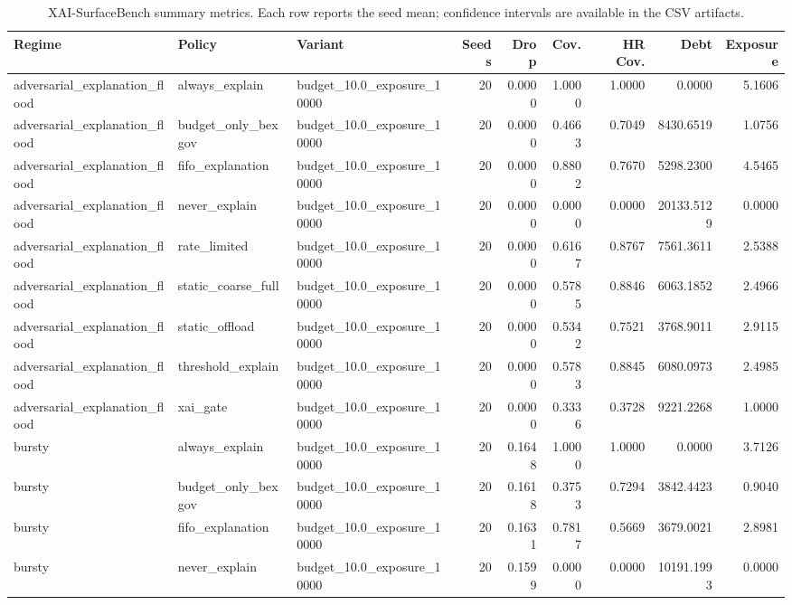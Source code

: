 \begin{table}[t]
\centering
\scriptsize
\caption{XAI-SurfaceBench summary metrics. Each row reports the seed mean; confidence intervals are available in the CSV artifacts.}
\begin{tabular}{lllrrrrrr}
\toprule
Regime & Policy & Variant & Seeds & Drop & Cov. & HR Cov. & Debt & Exposure \\
\midrule
adversarial\_explanation\_flood & always\_explain & budget\_10.0\_exposure\_10000 & 20 & 0.0000 & 1.0000 & 1.0000 & 0.0000 & 5.1606 \\
adversarial\_explanation\_flood & budget\_only\_bexgov & budget\_10.0\_exposure\_10000 & 20 & 0.0000 & 0.4663 & 0.7049 & 8430.6519 & 1.0756 \\
adversarial\_explanation\_flood & fifo\_explanation & budget\_10.0\_exposure\_10000 & 20 & 0.0000 & 0.8802 & 0.7670 & 5298.2300 & 4.5465 \\
adversarial\_explanation\_flood & never\_explain & budget\_10.0\_exposure\_10000 & 20 & 0.0000 & 0.0000 & 0.0000 & 20133.5129 & 0.0000 \\
adversarial\_explanation\_flood & rate\_limited & budget\_10.0\_exposure\_10000 & 20 & 0.0000 & 0.6167 & 0.8767 & 7561.3611 & 2.5388 \\
adversarial\_explanation\_flood & static\_coarse\_full & budget\_10.0\_exposure\_10000 & 20 & 0.0000 & 0.5785 & 0.8846 & 6063.1852 & 2.4966 \\
adversarial\_explanation\_flood & static\_offload & budget\_10.0\_exposure\_10000 & 20 & 0.0000 & 0.5342 & 0.7521 & 3768.9011 & 2.9115 \\
adversarial\_explanation\_flood & threshold\_explain & budget\_10.0\_exposure\_10000 & 20 & 0.0000 & 0.5783 & 0.8845 & 6080.0973 & 2.4985 \\
adversarial\_explanation\_flood & xai\_gate & budget\_10.0\_exposure\_10000 & 20 & 0.0000 & 0.3336 & 0.3728 & 9221.2268 & 1.0000 \\
bursty & always\_explain & budget\_10.0\_exposure\_10000 & 20 & 0.1648 & 1.0000 & 1.0000 & 0.0000 & 3.7126 \\
bursty & budget\_only\_bexgov & budget\_10.0\_exposure\_10000 & 20 & 0.1618 & 0.3753 & 0.7294 & 3842.4423 & 0.9040 \\
bursty & fifo\_explanation & budget\_10.0\_exposure\_10000 & 20 & 0.1631 & 0.7817 & 0.5669 & 3679.0021 & 2.8981 \\
bursty & never\_explain & budget\_10.0\_exposure\_10000 & 20 & 0.1599 & 0.0000 & 0.0000 & 10191.1993 & 0.0000 \\

\end{tabular}
\end{table}
